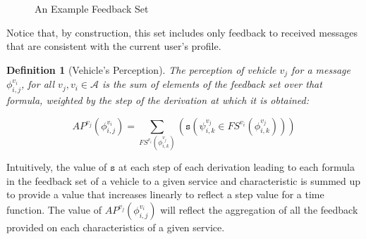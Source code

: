 \documentclass[compsoc, conference, letterpaper, 10pt, times]{IEEEtran}
\newtheorem{definition}{Definition}
\begin{document}
\begin{figure*}[h]
\begin{footnotesize}

	\begin{prooftree}
		
		\end{prooftree}
\end{footnotesize}
\caption{An Example Feedback Set}\label{fig:ask}
\vspace{-2mm}
\end{figure*}


Notice that, by construction, this set includes only feedback to received messages that are consistent with the current user's profile. 

\begin{definition}[Vehicle's Perception]
The perception of vehicle $v_{j}$ for a message $\phi^{v_{i}}_{i,j}$, for all $v_{j}, v_{i} \in \mathcal{A}$ is the sum of elements of the feedback set over that formula, weighted by the step of the derivation at which it is obtained: 

\[
AP^{v_{j}}(\phi^{v_{i}}_{i,j})=\sum_{FS^{v_{i}}(\phi^{v_{j}}_{i,k})}(\mathtt{s}(\psi^{v_{j}}_{i,k} \in FS^{v_{i}}(\phi^{v_{j}}_{i,k})))
\]

\end{definition}

Intuitively, the value of $\mathtt{s}$ at each step of each derivation leading to each formula in the feedback set of a vehicle to a given service and characteristic is summed up to provide a value that increases linearly to reflect a step value for a time function. The value of $AP^{v_{j}}(\phi^{v_{i}}_{i,j})$ will reflect the aggregation of all the feedback provided on each characteristics of a given service.  
\end{document}
